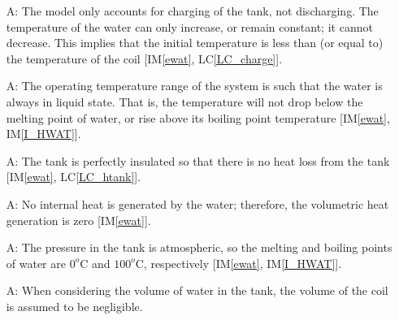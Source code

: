 \documentclass[12pt]{article}
\newcounter{assumpnum} %
\newcommand{\aref}[1]{A\ref{#1}}
\newcommand{\iref}[1]{IM\ref{#1}}
\newcommand{\lcref}[1]{LC\ref{#1}}
\begin{document}
\begin{itemize}
\item[A\refstepcounter{assumpnum}\theassumpnum \label{A_charge}:] The model only
  accounts for charging of the tank, not discharging.  The temperature of the
  water 
  can only increase, or remain constant; it cannot decrease.
  This implies that the initial temperature %
  is less than (or
  equal to) the temperature of the coil [\iref{ewat}, \lcref{LC_charge}].



\item[A\refstepcounter{assumpnum}\theassumpnum \label{A_OpRange}:] The operating
  temperature range of the system is such that the water is always in liquid
  state.  That is, the temperature will not drop below the melting point of water, or rise
  above its boiling point temperature [\iref{ewat}, \iref{I_HWAT}].

\item[A\refstepcounter{assumpnum}\theassumpnum \label{A_htank}:] The tank is
  perfectly insulated so that there is no heat loss from the tank [\iref{ewat},
  \lcref{LC_htank}].

\item[A\refstepcounter{assumpnum}\theassumpnum \label{A_int_heat}:] No internal
  heat is generated by the water;
  therefore, the volumetric
  heat generation is zero [\iref{ewat}].%
	


\item[A\refstepcounter{assumpnum}\theassumpnum \label{A_tk_prssr}:] The pressure
  in the tank is atmospheric, so the melting and boiling points of water are
  $0^o\text{C}$ and $100^o\text{C}$, respectively [\iref{ewat}, \iref{I_HWAT}].

\item[A\refstepcounter{assumpnum}\theassumpnum \label{A_VolCoil}:] When
  considering the volume of water in the tank, the volume of the coil is assumed
  to be negligible.
	
\end{itemize}
\end{document}
